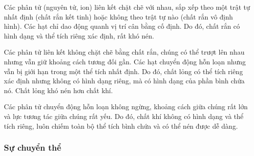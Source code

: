 \begin{kienthuc}
\begin{itemchoice}
    \item {} Các phân tử (nguyên tử, ion) liên kết chặt chẽ với nhau, sắp xếp theo một trật tự nhất định (chất rắn kết tinh) hoặc không theo trật tự nào (chất rắn vô định hình). Các hạt chỉ dao động quanh vị trí cân bằng cố định. Do đó, chất rắn có hình dạng và thể tích riêng xác định, rất khó nén.
    \item {} Các phân tử liên kết không chặt chẽ bằng chất rắn, chúng có thể trượt lên nhau nhưng vẫn giữ khoảng cách tương đối gần. Các hạt chuyển động hỗn loạn nhưng vẫn bị giới hạn trong một thể tích nhất định. Do đó, chất lỏng có thể tích riêng xác định nhưng không có hình dạng riêng, mà có hình dạng của phần bình chứa nó. Chất lỏng khó nén hơn chất khí.
    \item {} Các phân tử chuyển động hỗn loạn không ngừng, khoảng cách giữa chúng rất lớn và lực tương tác giữa chúng rất yếu. Do đó, chất khí không có hình dạng và thể tích riêng, luôn chiếm toàn bộ thể tích bình chứa và có thể nén được dễ dàng.
\end{itemchoice}
\end{kienthuc}

\subsubsection{Sự chuyển thể}


